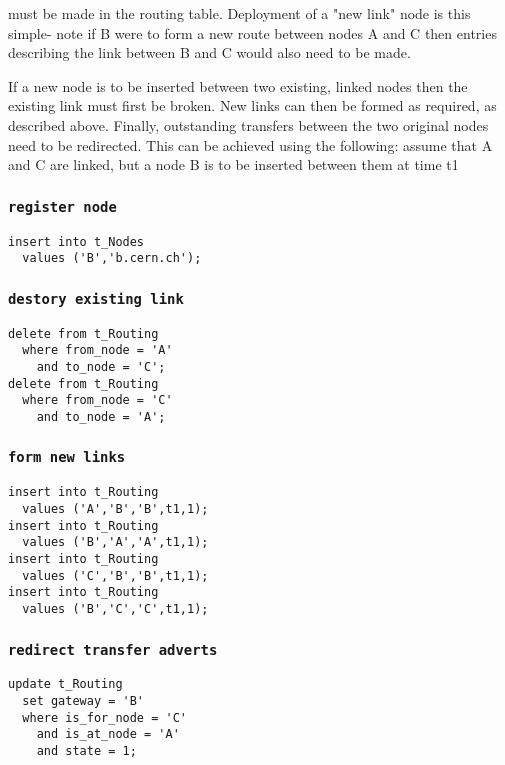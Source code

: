 \documentclass{cmspaper}
\begin{document}
must be made in the routing table. Deployment of a "new link" node is this simple- note if B were to form a new route between nodes A and C then entries describing the link between B and C would also need to be made.

If a new node is to be inserted between two existing, linked nodes then the existing link must first be broken. New links can then be formed as required, as described above. Finally, outstanding transfers between the two original nodes need to be redirected. This can be achieved using the following: assume that A and C are linked, but a node B is to be inserted between them at time t1

\subsubsection{\textbf{\texttt{register node}}}

{\small\begin{verbatim}
insert into t_Nodes
  values ('B','b.cern.ch');
\end{verbatim}}

\subsubsection{\textbf{\texttt{destory existing link}}}

{\small\begin{verbatim}
delete from t_Routing
  where from_node = 'A'
    and to_node = 'C';
delete from t_Routing
  where from_node = 'C'
    and to_node = 'A';
\end{verbatim}}

\subsubsection{\textbf{\texttt{form new links}}}

{\small\begin{verbatim}
insert into t_Routing
  values ('A','B','B',t1,1);
insert into t_Routing
  values ('B','A','A',t1,1);
insert into t_Routing
  values ('C','B','B',t1,1);
insert into t_Routing
  values ('B','C','C',t1,1);
\end{verbatim}}

\subsubsection{\textbf{\texttt{redirect transfer adverts}}}

{\small\begin{verbatim}
update t_Routing
  set gateway = 'B'
  where is_for_node = 'C'
    and is_at_node = 'A'
    and state = 1;
\end{verbatim}}
\end{document}
